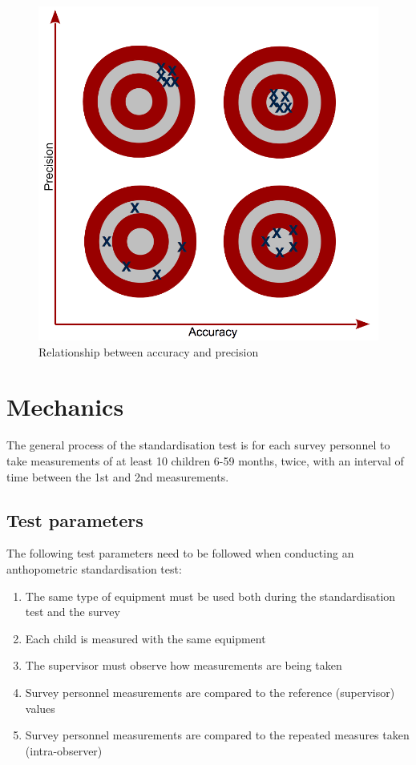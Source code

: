 \documentclass[12pt,]{book}
\theoremstyle{definition}
\theoremstyle{definition}
\theoremstyle{definition}
\theoremstyle{remark}
\begin{document}
\begin{figure}

{\centering \includegraphics[width=11.11in]{images/accuracyPrecision} 

}

\caption{Relationship between accuracy and precision}\label{fig:standard01}
\end{figure}

\hypertarget{mechanics}{%
\section{Mechanics}\label{mechanics}}

The general process of the standardisation test is for each survey
personnel to take measurements of at least 10 children 6-59 months,
twice, with an interval of time between the 1st and 2nd measurements.

\hypertarget{test-parameters}{%
\subsection{Test parameters}\label{test-parameters}}

The following test parameters need to be followed when conducting an
anthopometric standardisation test:

\begin{enumerate}
\def\labelenumi{\arabic{enumi}.}
\item
  The same type of equipment must be used both during the
  standardisation test and the survey
\item
  Each child is measured with the same equipment
\item
  The supervisor must observe how measurements are being taken
\item
  Survey personnel measurements are compared to the reference
  (supervisor) values
\item
  Survey personnel measurements are compared to the repeated measures
  taken (intra-observer)
\end{enumerate}
\end{document}
